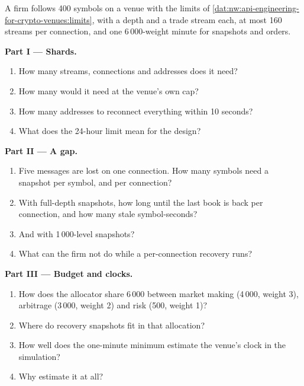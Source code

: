 \begin{problem}\label{pb:nw:api-engineering-for-crypto-venues:1}
A firm follows 400 symbols on a venue with the limits of \cref{dat:nw:api-engineering-for-crypto-venues:limits}, with a depth and a trade stream each,
at most 160 streams per connection, and one 6\,000-weight minute for snapshots and orders.

\medskip\noindent\textbf{Part I --- Shards.}
\begin{enumerate}
\item How many streams, connections and addresses does it need?
\item How many would it need at the venue's own cap?
\item How many addresses to reconnect everything within 10 seconds?
\item What does the 24-hour limit mean for the design?
\end{enumerate}

\medskip\noindent\textbf{Part II --- A gap.}
\begin{enumerate}[resume]
\item Five messages are lost on one connection. How many symbols need a snapshot per symbol, and per connection?
\item With full-depth snapshots, how long until the last book is back per connection, and how many stale symbol-seconds?
\item And with 1\,000-level snapshots?
\item What can the firm not do while a per-connection recovery runs?
\end{enumerate}

\medskip\noindent\textbf{Part III --- Budget and clocks.}
\begin{enumerate}[resume]
\item How does the allocator share 6\,000 between market making (4\,000, weight 3), arbitrage (3\,000, weight 2) and risk (500, weight 1)?
\item Where do recovery snapshots fit in that allocation?
\item How well does the one-minute minimum estimate the venue's clock in the simulation?
\item Why estimate it at all?
\end{enumerate}


\end{problem}
